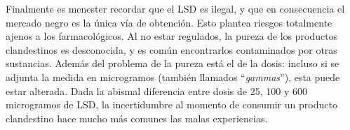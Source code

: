 Finalmente es menester recordar que el LSD es ilegal, y que en consecuencia el mercado negro es la única vía de obtención. Esto plantea riesgos totalmente ajenos a los farmacológicos. Al no estar regulados, la pureza de los productos clandestinos es desconocida, y es común encontrarlos contaminados por otras sustancias. Además del problema de la pureza está el de la dosis: incluso si se adjunta la medida en microgramos (también llamados \enquote{\textit{gammas}}), esta puede estar alterada. Dada la abismal diferencia entre dosis de 25, 100 y 600 microgramos de LSD, la incertidumbre al momento de consumir un producto clandestino hace mucho más comunes las malas experiencias.

\newpage
